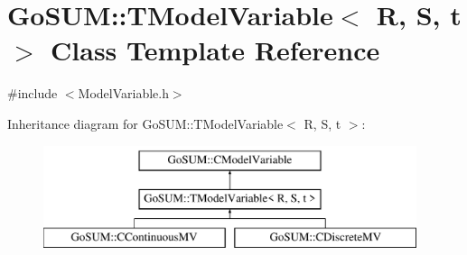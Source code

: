 \hypertarget{class_go_s_u_m_1_1_t_model_variable}{\section{Go\-S\-U\-M\-:\-:T\-Model\-Variable$<$ R, S, t $>$ Class Template Reference}
\label{class_go_s_u_m_1_1_t_model_variable}
}


{\ttfamily \#include $<$Model\-Variable.\-h$>$}

Inheritance diagram for Go\-S\-U\-M\-:\-:T\-Model\-Variable$<$ R, S, t $>$\-:\begin{figure}[H]
\begin{center}
\leavevmode
\includegraphics[height=3.000000cm]{class_go_s_u_m_1_1_t_model_variable}
\end{center}
\end{figure}
